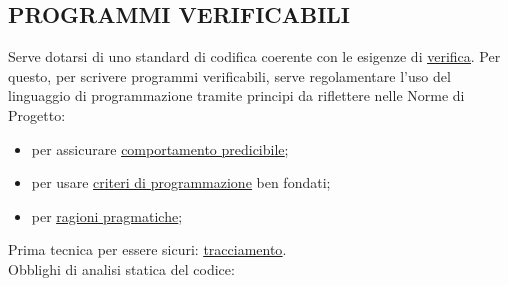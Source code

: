 		\subsection{PROGRAMMI VERIFICABILI}		\label{programmiverificabili} %
		Serve dotarsi di uno standard di codifica coerente con le esigenze di \underline{\hyperref[verificare]{verifica}}. Per questo, per scrivere programmi verificabili, serve regolamentare l’uso del linguaggio di programmazione tramite principi da riflettere nelle Norme di Progetto:
		\begin{itemize}
			\item per assicurare \underline{\hyperref[comportamentopredicibile]{comportamento predicibile}};
			\item per usare \underline{\hyperref[criteriprog]{criteri di programmazione}} ben fondati;
			\item per \underline{\hyperref[pragmatico]{ragioni pragmatiche}};
		\end{itemize}
		Prima tecnica per essere sicuri: \underline{\hyperref[tracciamento]{tracciamento}}. \\
		Obblighi di analisi statica del codice: %
